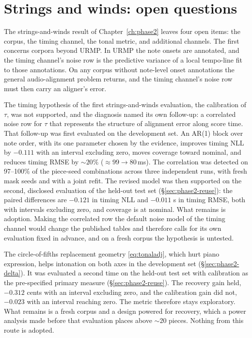 \section{Strings and winds: open questions}
The strings-and-winds result of Chapter~\ref{ch:phase2} leaves four open
items: the corpus, the timing channel, the tonal metric, and additional
channels. The first concerns corpora beyond URMP. In URMP the note onsets
are annotated, and the timing channel's noise row is the predictive variance
of a local tempo-line fit to those annotations. On any corpus without
note-level onset annotations the general audio-alignment problem returns,
and the timing channel's noise row must then carry an aligner's error.

The timing hypothesis of the first strings-and-winds evaluation, the
calibration of $\tau$, was not supported, and the diagnosis named its own
follow-up: a correlated noise row for $\tau$ that represents the structure
of alignment error along score time. That follow-up was first evaluated on
the development set. An AR(1) block over note order, with its one parameter
chosen by the evidence, improves timing NLL by $-0.111$ with an interval
excluding zero, moves coverage toward nominal, and reduces timing RMSE by
${\sim}20\%$ ($\approx 99 \to 80$\,ms). The correlation was detected on
97--100\% of the piece-seed combinations across three independent runs,
with fresh mask seeds and with a joint refit. The revised model was then
supported on the second, disclosed evaluation of the held-out test set
(\S\ref{sec:phase2-reuse}): the paired differences are $-0.121$ in timing
NLL and $-0.011$ s in timing RMSE, both with intervals excluding zero, and
coverage is at nominal. What remains is adoption. Making the correlated row
the default noise model of the timing channel would change the published
tables and therefore calls for its own evaluation fixed in advance, and on a
fresh corpus the hypothesis is untested.

The circle-of-fifths replacement geometry \eqref{eq:tonaladj}, which hurt
piano expression, helps intonation on both axes in the development set
(\S\ref{sec:phase2-delta}). It was evaluated a second time on the held-out
test set with calibration as the pre-specified primary measure
(\S\ref{sec:phase2-reuse}). The recovery gain held, $-0.312$ cents with an
interval excluding zero, and the calibration gain did not, $-0.023$ with an
interval reaching zero. The metric therefore stays exploratory. What remains
is a fresh corpus and a design powered for recovery, which a power analysis
made before that evaluation places above ${\sim}20$ pieces. Nothing from
this route is adopted.

